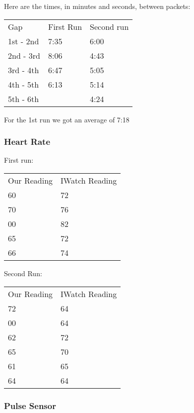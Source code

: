 			Here are the times, in minutes and seconds, between packets:
			\begin{table}[h]
				\begin{tabular}{@{}lll@{}}
					Gap 	    &	First Run   & 	Second run 	 \\
					1st - 2nd 	&	7:35		& 	6:00     	 \\
					2nd - 3rd 	&	8:06    	& 	4:43         \\
					3rd - 4th 	&	6:47		& 	5:05         \\
					4th - 5th 	&	6:13    	& 	5:14         \\
					5th - 6th 	&	         	& 	4:24         \\
				\end{tabular}
			\end{table}

			For the 1st run we got an average of 7:18

		\subsubsection{Heart Rate}
			First run:
			\begin{table}[h]
				\begin{tabular}{@{}ll@{}}
					Our Reading & IWatch Reading \\
					60          & 72             \\
					70          & 76             \\
					00          & 82             \\
					65          & 72             \\
					66          & 74            
				\end{tabular}
			\end{table}
			Second Run:
			\begin{table}[h]
				\begin{tabular}{@{}ll@{}}
					Our Reading & IWatch Reading \\
					72          & 64             \\
					00          & 64             \\
					62          & 72             \\
					65          & 70             \\
					61          & 65      		 \\      
					64          & 64
				\end{tabular}
			\end{table}

		\subsubsection{Pulse Sensor}

